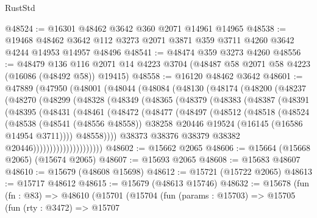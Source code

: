 \begin{lexlean}{RustStd}
\begin{coremodule}
@48524 := @16301 @48462 @3642 @360 @2071 @14961 @14965
@48538 := @19468
    @48462
    @3642
    @112
    @3273
    @2071
    @3871
    @359
    @3711
    @4260
    @3642
    @4244
    @14953
    @14957
    @48496
@48541 := @48474 @359 @3273 @4260
@48556 := @48479
    @136
    @116
    @2071
    @14
    @4223
    @3704
    (@48487 @58 @2071 @58 @4223 (@16086 (@48492 @58)) @19415)
@48558 := @16120 @48462 @3642
@48601 := @47889
    (@47950
      (@48001
        (@48044
          (@48084
            (@48130
              (@48174
                (@48200
                  (@48237
                    (@48270
                      (@48299
                        (@48328
                          (@48349
                            (@48365
                              (@48379
                                (@48383
                                  (@48387
                                    (@48391
                                      (@48395
                                        (@48431
                                          (@48461
                                            (@48472
                                              (@48477
                                                (@48497
                                                  (@48512
                                                    (@48518
                                                      (@48524
                                                        (@48538
                                                          (@48541 (@48556 @48558))
                                                          @38258
                                                          @20446
                                                          @19524
                                                          (@16145 (@16586 @14954 @3711))))
                                                      @48558))))
                                              @38373
                                              @38376
                                              @38379
                                              @38382
                                              @20446)))))))))))))))))))))
@48602 := @15662 @2065
@48606 := @15664 (@15668 @2065) (@15674 @2065)
@48607 := @15693 @2065
@48608 := @15683 @48607
@48610 := @15679 (@48608 @15698)
@48612 := @15721 (@15722 @2065)
@48613 := @15717 @48612
@48615 := @15679 (@48613 @15746)
@48632 := @15678
    (fun (fn : @83) =>
    @48610
      (@15701
        (@15704
          (fun (params : @15703) =>
          @15705
            (fun (rty : @3472) =>
            @15707

\end{coremodule}
\end{lexlean}
